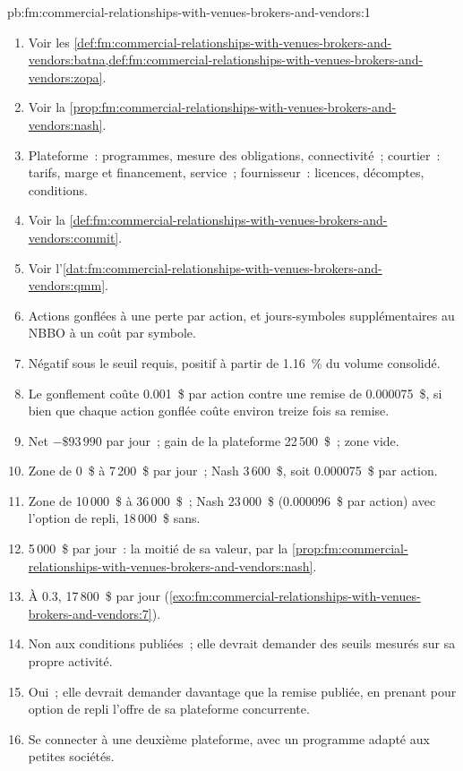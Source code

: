 \begin{solution}{pb:fm:commercial-relationships-with-venues-brokers-and-vendors:1}
\begin{enumerate}
\item Voir les \cref{def:fm:commercial-relationships-with-venues-brokers-and-vendors:batna,def:fm:commercial-relationships-with-venues-brokers-and-vendors:zopa}.
\item Voir la \cref{prop:fm:commercial-relationships-with-venues-brokers-and-vendors:nash}.
\item Plateforme~: programmes, mesure des obligations, connectivité~; courtier~: tarifs, marge et financement, service~; fournisseur~: licences, décomptes, conditions.
\item Voir la \cref{def:fm:commercial-relationships-with-venues-brokers-and-vendors:commit}.
\item Voir l'\cref{dat:fm:commercial-relationships-with-venues-brokers-and-vendors:qmm}.
\item Actions gonflées à une perte par action, et jours-symboles supplémentaires au NBBO à un coût par symbole.
\item Négatif sous le seuil requis, positif à partir de 1.16~\% du volume consolidé.
\item Le gonflement coûte 0.001~\$ par action contre une remise de 0.000075~\$, si bien que chaque action gonflée coûte environ treize fois sa remise.
\item Net $-\$93\,990$ par jour~; gain de la plateforme 22\,500~\$~; zone vide.
\item Zone de 0~\$ à 7\,200~\$ par jour~; Nash 3\,600~\$, soit 0.000075~\$ par action.
\item Zone de 10\,000~\$ à 36\,000~\$~; Nash 23\,000~\$ (0.000096~\$ par action) avec l'option de repli, 18\,000~\$ sans.
\item 5\,000~\$ par jour~: la moitié de sa valeur, par la \cref{prop:fm:commercial-relationships-with-venues-brokers-and-vendors:nash}.
\item À 0.3, 17\,800~\$ par jour (\cref{exo:fm:commercial-relationships-with-venues-brokers-and-vendors:7}).
\item Non aux conditions publiées~; elle devrait demander des seuils mesurés sur sa propre activité.
\item Oui~; elle devrait demander davantage que la remise publiée, en prenant pour option de repli l'offre de sa plateforme concurrente.
\item Se connecter à une deuxième plateforme, avec un programme adapté aux petites sociétés.

\end{enumerate}
\end{solution}
